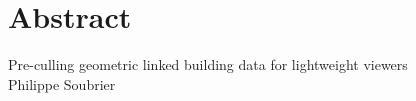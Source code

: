 \chapter*{\centering Abstract}
\begin{center}
    \sffamily
    \LARGE Pre-culling geometric linked building data
    for lightweight viewers\\
    \Large Philippe Soubrier
\end{center}

\lipsum[1-2]